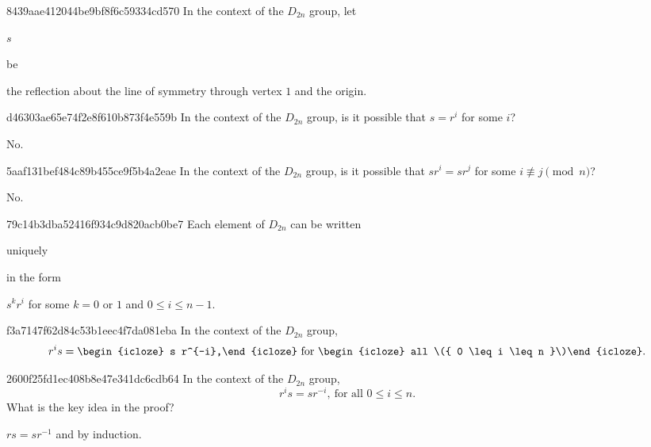 \begin{note}{8439aae412044be9bf8f6c59334cd570}
    In the context of the \({ D_{2n} }\) group, let \begin{icloze}{2}\({ s }\)\end{icloze} be \begin{icloze}{1}the reflection about the line of symmetry through vertex \({ 1 }\) and the origin.\end{icloze}
\end{note}

\begin{note}{d46303ae65e74f2e8f610b873f4e559b}
    In the context of the \({ D_{2n} }\) group,
    is it possible that \({ s = r^{i} }\) for some \({ i }\)?

    \begin{cloze}{1}
        No.
    \end{cloze}
\end{note}

\begin{note}{5aaf131bef484c89b455ce9f5b4a2eae}
    In the context of the \({ D_{2n} }\) group,
    is it possible that \({ s r^{i} = s r ^{j} }\) for some \({ i \not \equiv j \pmod n }\)?

    \begin{cloze}{1}
        No.
    \end{cloze}
\end{note}

\begin{note}{79c14b3dba52416f934c9d820acb0be7}
    Each element of \({ D_{2n} }\) can be written \begin{icloze}{2}uniquely\end{icloze} in the form \begin{icloze}{1}\({ s^{k}r^{i} }\) for some \({ k = 0 }\) or \({ 1 }\) and \({ 0 \leq i \leq n - 1 }\).\end{icloze}
\end{note}

\begin{note}{f3a7147f62d84c53b1eec4f7da081eba}
    In the context of the \({ D_{2n} }\) group,
    \[
        r^{i}s = \begin{icloze}{1}s r^{-i},\end{icloze}\ \text{for \begin{icloze}{2}all \({ 0 \leq i \leq n }\)\end{icloze}}.
    \]
\end{note}

\begin{note}{2600f25fd1ec408b8e47e341dc6cdb64}
    In the context of the \({ D_{2n} }\) group,
    \[
        r^{i}s = s r^{-i},\ \text{for all \({ 0 \leq i \leq n }\)}.
    \]
    What is the key idea in the proof?

    \begin{cloze}{1}
        \({ rs = s r^{-1} }\) and by induction.
    \end{cloze}
\end{note}

